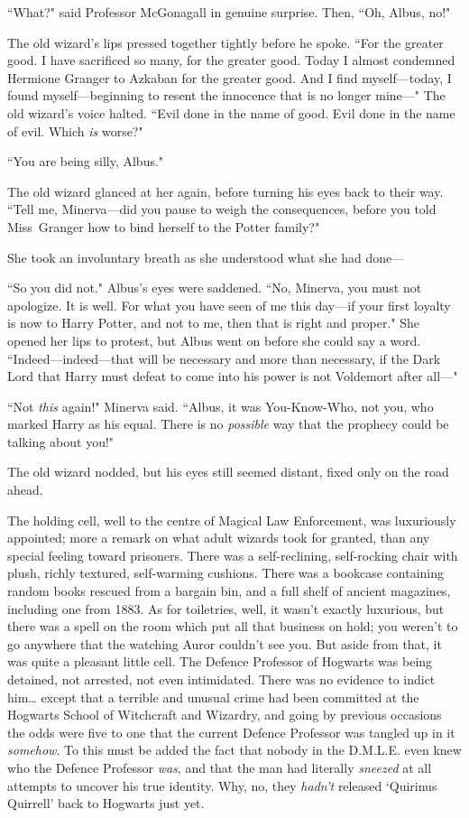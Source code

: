 ``What?" said Professor McGonagall in genuine surprise. Then, ``Oh, Albus, no!"

The old wizard's lips pressed together tightly before he spoke. ``For the greater good. I have sacrificed so many, for the greater good. Today I almost condemned Hermione Granger to Azkaban for the greater good. And I find myself—today, I found myself—beginning to resent the innocence that is no longer mine—" The old wizard's voice halted. ``Evil done in the name of good. Evil done in the name of evil. Which \emph{is} worse?"

``You are being silly, Albus."

The old wizard glanced at her again, before turning his eyes back to their way. ``Tell me, Minerva—did you pause to weigh the consequences, before you told Miss~Granger how to bind herself to the Potter family?"

She took an involuntary breath as she understood what she had done—

``So you did not." Albus's eyes were saddened. ``No, Minerva, you must not apologize. It is well. For what you have seen of me this day—if your first loyalty is now to Harry Potter, and not to me, then that is right and proper." She opened her lips to protest, but Albus went on before she could say a word. ``Indeed—indeed—that will be necessary and more than necessary, if the Dark Lord that Harry must defeat to come into his power is not Voldemort after all—"

``Not \emph{this} again!" Minerva said. ``Albus, it was You-Know-Who, not you, who marked Harry as his equal. There is no \emph{possible} way that the prophecy could be talking about you!"

The old wizard nodded, but his eyes still seemed distant, fixed only on the road ahead.

\later

The holding cell, well to the centre of Magical Law Enforcement, was luxuriously appointed; more a remark on what adult wizards took for granted, than any special feeling toward prisoners. There was a self-reclining, self-rocking chair with plush, richly textured, self-warming cushions. There was a bookcase containing random books rescued from a bargain bin, and a full shelf of ancient magazines, including one from 1883. As for toiletries, well, it wasn't exactly luxurious, but there was a spell on the room which put all that business on hold; you weren't to go anywhere that the watching Auror couldn't see you. But aside from that, it was quite a pleasant little cell. The Defence Professor of Hogwarts was being detained, not arrested, not even intimidated. There was no evidence to indict him{\ldots} except that a terrible and unusual crime had been committed at the Hogwarts School of Witchcraft and Wizardry, and going by previous occasions the odds were five to one that the current Defence Professor was tangled up in it \emph{somehow}. To this must be added the fact that nobody in the D.M.L.E. even knew who the Defence Professor \emph{was}, and that the man had literally \emph{sneezed} at all attempts to uncover his true identity. Why, no, they \emph{hadn't} released `Quirinus Quirrell' back to Hogwarts just yet.


